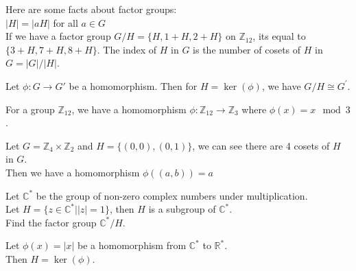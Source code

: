 
\begin{remark}
    Here are some facts about factor groups:\\
    $|H| = |aH|$ for all $a \in G$\\
    If we have a factor group $G/H = \{H, 1+H, 2+H\}$ on $\mathbb{Z}_12$, its equal to $\{3+H, 7+H, 8+H\}$.
    The index of $H$ in $G$ is the number of cosets of $H$ in $G = |G|/|H|$.\\
\end{remark}

\begin{theorem}
    Let $\phi: G \to G'$ be a homomorphism. Then for $H = \ker(\phi)$, we have $G/H \cong G^{\prime}$.
\end{theorem}

\begin{eg}
    For a group $\mathbb{Z}_{12}$, we have a homomorphism $\phi: \mathbb{Z}_{12} \to \mathbb{Z}_3$ where $\phi(x) = x \mod 3$.\\
\end{eg}

\begin{eg}
    Let $G = \mathbb{Z}_4 \times \mathbb{Z}_2$ and $H = \{(0, 0), (0, 1)\}$, we can see there are 4 cosets of $H$ in $G$.\\
    Then we have a homomorphism $\phi((a, b)) = a$ 
\end{eg}

\begin{eg}
    Let $\mathbb{C}^{\ast}$ be the group of non-zero complex numbers under multiplication.\\
    Let $H = \{z \in \mathbb{C}^{\ast} | |z| = 1\}$, then $H$ is a subgroup of $\mathbb{C}^{\ast}$.\\
    Find the factor group $\mathbb{C}^{\ast}/H$.\\
\end{eg}
\begin{answer}
    Let $\phi(x) = |x|$ be a homomorphism from $\mathbb{C}^{\ast}$ to $\mathbb{R}^{\ast}$.\\
    Then $H = \ker(\phi)$.\\
\end{answer}